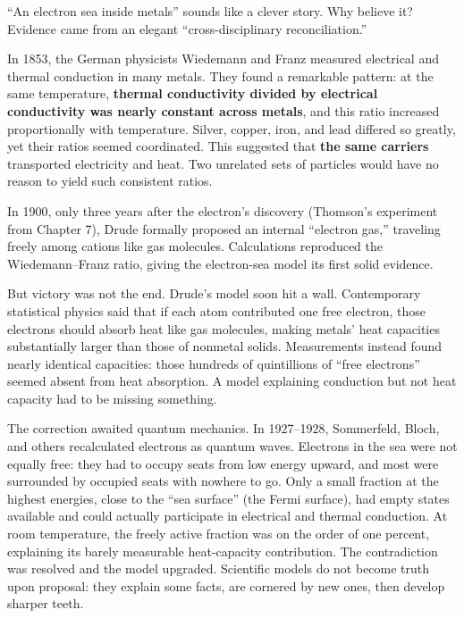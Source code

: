 \begin{zhengju}
``An electron sea inside metals'' sounds like a clever story. Why believe it? Evidence came from an elegant ``cross-disciplinary reconciliation.''

In 1853, the German physicists Wiedemann and Franz measured electrical and thermal conduction in many metals. They found a remarkable pattern: at the same temperature, \textbf{thermal conductivity divided by electrical conductivity was nearly constant across metals}, and this ratio increased proportionally with temperature. Silver, copper, iron, and lead differed so greatly, yet their ratios seemed coordinated. This suggested that \textbf{the same carriers} transported electricity and heat. Two unrelated sets of particles would have no reason to yield such consistent ratios.

In 1900, only three years after the electron's discovery (Thomson's experiment from Chapter 7), Drude formally proposed an internal ``electron gas,'' traveling freely among cations like gas molecules. Calculations reproduced the Wiedemann--Franz ratio, giving the electron-sea model its first solid evidence.

But victory was not the end. Drude's model soon hit a wall. Contemporary statistical physics said that if each atom contributed one free electron, those electrons should absorb heat like gas molecules, making metals' heat capacities substantially larger than those of nonmetal solids. Measurements instead found nearly identical capacities: those hundreds of quintillions of ``free electrons'' seemed absent from heat absorption. A model explaining conduction but not heat capacity had to be missing something.

The correction awaited quantum mechanics. In 1927--1928, Sommerfeld, Bloch, and others recalculated electrons as quantum waves. Electrons in the sea were not equally free: they had to occupy seats from low energy upward, and most were surrounded by occupied seats with nowhere to go. Only a small fraction at the highest energies, close to the ``sea surface'' (the Fermi surface), had empty states available and could actually participate in electrical and thermal conduction. At room temperature, the freely active fraction was on the order of one percent, explaining its barely measurable heat-capacity contribution. The contradiction was resolved and the model upgraded. Scientific models do not become truth upon proposal: they explain some facts, are cornered by new ones, then develop sharper teeth.
\end{zhengju}

